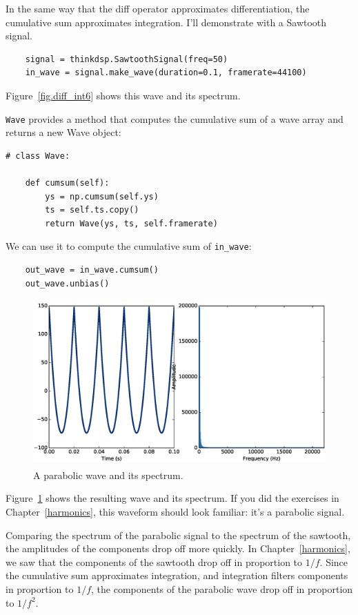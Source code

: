 \documentclass[12pt]{book}
\begin{document}
In the same way that the diff operator approximates differentiation,
the cumulative sum approximates integration.
I'll demonstrate with a Sawtooth signal.

\begin{verbatim}
    signal = thinkdsp.SawtoothSignal(freq=50)
    in_wave = signal.make_wave(duration=0.1, framerate=44100)
\end{verbatim}

Figure~\ref{fig.diff_int6} shows this wave and its spectrum.

{\tt Wave} provides a method that computes the cumulative sum of
a wave array and returns a new Wave object:

\begin{verbatim}
# class Wave:

    def cumsum(self):
        ys = np.cumsum(self.ys)
        ts = self.ts.copy()
        return Wave(ys, ts, self.framerate)
\end{verbatim}

We can use it to compute the cumulative sum of \verb"in_wave":

\begin{verbatim}
    out_wave = in_wave.cumsum()
    out_wave.unbias()
\end{verbatim}

\begin{figure}
\centerline{\includegraphics[height=2.5in]{figs/diff_int7.eps}}
\caption{A parabolic wave and its spectrum.}
\label{fig.diff_int7}
\end{figure}

Figure~\ref{fig.diff_int7} shows the resulting wave and its spectrum.
If you did the exercises in Chapter~\ref{harmonics}, this waveform should
look familiar: it's a parabolic signal.

Comparing the spectrum of the parabolic signal to the spectrum of the
sawtooth, the amplitudes of the components drop off more quickly.  In
Chapter~\ref{harmonics}, we saw that the components of the sawtooth
drop off in proportion to $1/f$.  Since the cumulative sum
approximates integration, and integration filters components in
proportion to $1/f$, the components of the parabolic wave drop off in
proportion to $1/f^2$.
\end{document}

